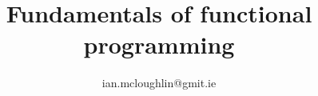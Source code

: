 \documentclass[dvipsnames, hidelinks]{beamer}
\begin{document}
  \title{Fundamentals of functional programming}
  \subtitle{}
  \author{ian.mcloughlin@gmit.ie}
  \date{}

  \begin{frame}
    \titlepage
  \end{frame}

   
\end{document}
